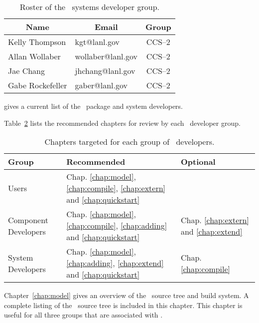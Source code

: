\begin{table}
  \begin{center}
    \caption{Roster of the \draco\ systems developer group.}
    \label{tab:draco_system}
    \begin{tabular}{llc}\hline\hline
      \multicolumn{1}{c}{Name} & \multicolumn{1}{c}{Email} &
      Group \\ \hline
      Kelly Thompson & kgt@lanl.gov & CCS--2 \\
      Allan Wollaber & wollaber@lanl.gov & CCS--2 \\
      Jae Chang & jhchang@lanl.gov & CCS--2 \\
      Gabe Rockefeller& gaber@lanl.gov & CCS--2 \\
\hline\hline
    \end{tabular}
  \end{center}
\end{table}
gives a current list of the \draco\ package and system developers.

Table~\ref{tab:layout} lists the recommended chapters for review by each \draco\ developer group.
\begin{table}
  \begin{center}
    \caption{Chapters targeted for each group of \draco\ developers.}
    \label{tab:layout}
    \begin{tabular}{lll}\hline\hline
          Group                             & Recommended  & Optional \\ \hline
	Users                             & Chap. \ref{chap:model}, \ref{chap:compile}, \ref{chap:extern} and \ref{chap:quickstart} &    \\
	Component Developers & Chap. \ref{chap:model}, \ref{chap:compile}, \ref{chap:adding} and \ref{chap:quickstart} & Chap. \ref{chap:extern} and \ref{chap:extend}  \\
	System Developers        & Chap. \ref{chap:model}, \ref{chap:adding},  \ref{chap:extend} and \ref{chap:quickstart} & Chap. \ref{chap:compile} \\  \hline \hline

    \end{tabular}
  \end{center}
\end{table}
Chapter~\ref{chap:model} gives an overview of the \draco\ source tree
and build system. A complete listing of the \draco\ source tree is
included in this chapter. This chapter is useful for all three groups
that are associated with \draco.

